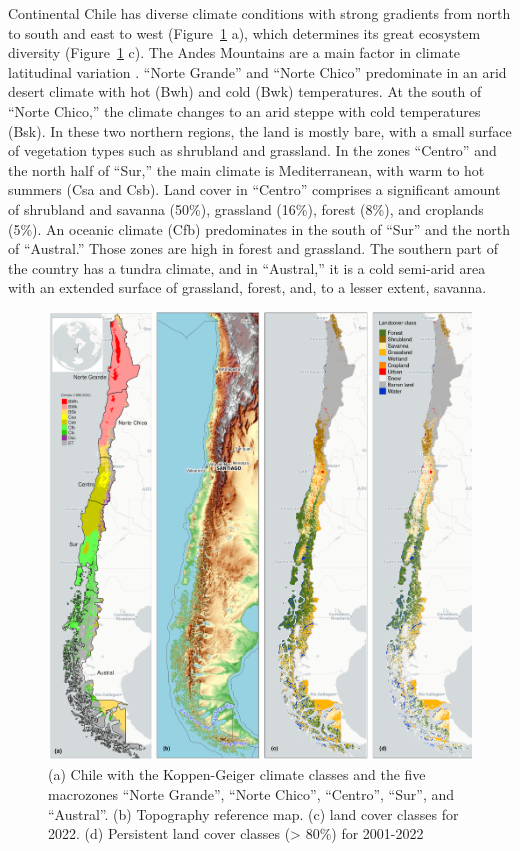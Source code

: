 \documentclass[
  authoryear,
  preprint,
  3p,
  onecolumn]{elsarticle}
\begin{document}
Continental Chile has diverse climate conditions with strong gradients
from north to south and east to west \citep{Aceituno2021}
(Figure~\ref{fig-studyArea} a), which determines its great ecosystem
diversity \citep{Luebert2022} (Figure~\ref{fig-studyArea} c). The Andes
Mountains are a main factor in climate latitudinal variation
\citep{Garreaud2009}. ``Norte Grande'' and ``Norte Chico'' predominate
in an arid desert climate with hot (Bwh) and cold (Bwk) temperatures. At
the south of ``Norte Chico,'' the climate changes to an arid steppe with
cold temperatures (Bsk). In these two northern regions, the land is
mostly bare, with a small surface of vegetation types such as shrubland
and grassland. In the zones ``Centro'' and the north half of ``Sur,''
the main climate is Mediterranean, with warm to hot summers (Csa and
Csb). Land cover in ``Centro'' comprises a significant amount of
shrubland and savanna (50\%), grassland (16\%), forest (8\%), and
croplands (5\%). An oceanic climate (Cfb) predominates in the south of
``Sur'' and the north of ``Austral.'' Those zones are high in forest and
grassland. The southern part of the country has a tundra climate, and in
``Austral,'' it is a cold semi-arid area with an extended surface of
grassland, forest, and, to a lesser extent, savanna.

\begin{figure}[!ht]

{\centering \includegraphics{../output/figs/map_study_con_landcover.png}

}

\caption{\label{fig-studyArea}(a) Chile with the Koppen-Geiger climate
classes and the five macrozones ``Norte Grande'', ``Norte Chico'',
``Centro'', ``Sur'', and ``Austral''. (b) Topography reference map. (c)
land cover classes for 2022. (d) Persistent land cover classes
(\textgreater{} 80\%) for 2001-2022}

\end{figure}
\end{document}
